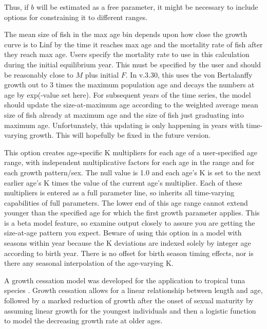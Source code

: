 Thus, if $b$ will be estimated as a free parameter, it might be necessary to include options for constraining it to different ranges.

	
The mean size of fish in the max age bin depends upon how close the growth curve is to Linf by the time it reaches max age and the mortality rate of fish after they reach max age. Users specify the mortality rate to use in this calculation during the initial equilibrium year. This must be specified by the user and should be reasonably close to $M$ plus initial $F$. In v.3.30, this uses the von Bertalanffy growth out to 3 times the maximum population age and decays the numbers at age by exp(-value set here). For subsequent years of the time series, the model should update the size-at-maximum age according to the weighted average mean size of fish already at maximum age and the size of fish just graduating into maximum age. Unfortunately, this updating is only happening in years with time-varying growth. This will hopefully be fixed in the future version.
	
This option creates age-specific K multipliers for each age of a user-specified age range, with independent multiplicative factors for each age in the range and for each growth pattern/sex. The null value is 1.0 and each age's K is set to the next earlier age's K times the value of the current age's multiplier. Each of these multipliers is entered as a full parameter line, so inherits all time-varying capabilities of full parameters. The lower end of this age range cannot extend younger than the specified age for which the first growth parameter applies. This is a beta model feature, so examine output closely to assure you are getting the size-at-age pattern you expect. Beware of using this option in a model with seasons within year because the K deviations are indexed solely by integer age according to birth year. There is no offset for birth season timing effects, nor is there any seasonal interpolation of the age-varying K.

\hypertarget{GrowthCessation}{}
A growth cessation model was developed for the application to tropical tuna species \citep{maunder-growth-2018}. Growth cessation allows for a linear relationship between length and age, followed by a marked reduction of growth after the onset of sexual maturity by assuming linear growth for the youngest individuals and then a logistic function to model the decreasing growth rate at older ages.

